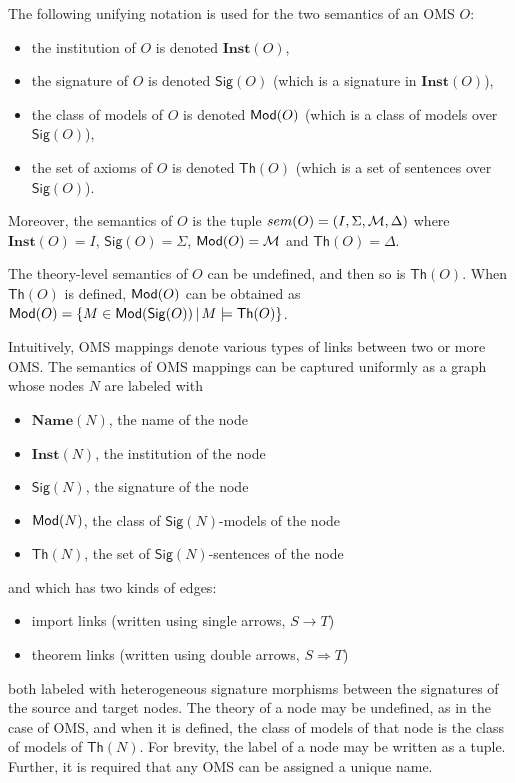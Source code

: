 \documentclass[10pt,fleqn,final]{scrreprt}
\newcommand{\Sig}{\mathsf{Sig}}
\renewcommand{\Th}{\mathsf{Th}}
\newcommand{\Inst}{\ensuremath{\mathbf{Inst}}}
\newcommand{\Name}{\ensuremath{\mathbf{Name}}}
\newenvironment{definitions}[0]{\medskip }{}
\begin{document}
\begin{definitions}
 The following unifying notation is used for the two semantics of an OMS $O$:\begin{itemize}
 \item the institution of $O$ is denoted $\Inst(O)$,
  \item the signature of $O$ is denoted $\Sig(O)$ (which is a signature in $\Inst(O)$),
  \item the class of models of $O$ is denoted $\mathsf{Mod}(O)$ (which is a class of models over $\Sig(O)$),
  \item the set of axioms of $O$ is denoted $\Th(O)$ (which is a set of sentences over $\Sig(O)$).
\end{itemize}
\noindent Moreover, the semantics of $O$ is the tuple $sem(O) = (I, \Sigma, {\cal M},\Delta)$
where $\Inst(O) = I$, $\Sig(O) = \Sigma$, $\mathsf{Mod}(O) = {\cal M}$ and $\Th(O) = \Delta$.

The theory-level semantics of $O$ can be undefined, and then so is $\Th(O)$. When $\Th(O)$ is defined, $\mathsf{Mod}(O)$ can be obtained as $\Mod(O)=\{M\in\Mod(\Sig(O)) \,|\, M\models\Th(O)\}$.

Intuitively, OMS mappings denote various types of links between two or more OMS. 
The semantics of OMS mappings can be captured uniformly as a graph whose nodes $N$ are labeled with 
\begin{itemize}
 \item $\Name(N)$, the name of the node
 \item $\Inst(N)$, the institution of the node
 \item $\Sig(N)$, the signature of the node
 \item $\mathsf{Mod}(N)$, the class of $\Sig(N)$-models of the node
 \item $\Th(N)$, the set of $\Sig(N)$-sentences of the node
\end{itemize}
and 
which has two kinds of edges:
\begin{itemize}
  \item import links (written using single arrows, $S\rightarrow T$)
  \item theorem links (written using double arrows, $S\Rightarrow T$)
\end{itemize}
both labeled with 
heterogeneous signature morphisms between the signatures of the source and target nodes.
The theory of a node  may be undefined, as in the case of OMS, and when it is defined, 
the class of models of that node is the class of models of $\Th(N)$. 
For brevity,  the label of a node may be written as a tuple. Further, it is required that  any OMS can be assigned a unique name. 


\end{definitions}
\end{document}
